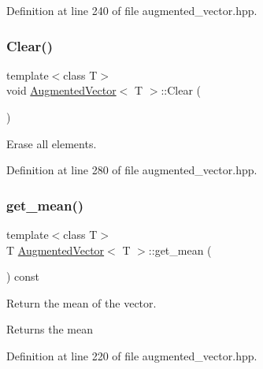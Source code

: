 Definition at line 240 of file augmented\+\_\+vector.\+hpp.

\mbox{\label{classAugmentedVector_ace877663b5bd547612aaaf2a9f58b94e}} 
\subsubsection{\texorpdfstring{Clear()}{Clear()}}
{\footnotesize\ttfamily template$<$class T$>$ \\
void \hyperlink{classAugmentedVector}{Augmented\+Vector}$<$ T $>$\+::Clear (\begin{DoxyParamCaption}{ }\end{DoxyParamCaption})\hspace{0.3cm}{\ttfamily [inline]}}



Erase all elements. 



Definition at line 280 of file augmented\+\_\+vector.\+hpp.

\mbox{\label{classAugmentedVector_a5d6d742b8f707dd25ed0ad75208a2444}} 
\subsubsection{\texorpdfstring{get\+\_\+mean()}{get\_mean()}}
{\footnotesize\ttfamily template$<$class T$>$ \\
T \hyperlink{classAugmentedVector}{Augmented\+Vector}$<$ T $>$\+::get\+\_\+mean (\begin{DoxyParamCaption}{ }\end{DoxyParamCaption}) const\hspace{0.3cm}{\ttfamily [inline]}}



Return the mean of the vector. 

\begin{DoxyReturn}{Returns}
the mean 
\end{DoxyReturn}


Definition at line 220 of file augmented\+\_\+vector.\+hpp.



